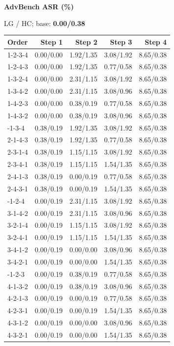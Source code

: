 \hfill
\begin{minipage}[t]{0.325\linewidth}
\centering
{\bfseries AdvBench ASR (\%)}\par
{\small LG / HC; base: \textbf{0.00/0.38}}\par\vspace{5pt}
\small\setlength{\tabcolsep}{3.5pt}\renewcommand{\arraystretch}{1.19}
\begin{tabular}{@{}lrrrr@{}}
\toprule Order & Step 1 & Step 2 & Step 3 & Step 4 \\
\midrule
1-2-3-4 & 0.00/0.00 & 1.92/1.35 & 3.08/1.92 & 8.65/0.38 \\
1-2-4-3 & 0.00/0.00 & 1.92/1.35 & 0.77/0.58 & 8.65/0.38 \\
1-3-2-4 & 0.00/0.00 & 2.31/1.15 & 3.08/1.92 & 8.65/0.38 \\
1-3-4-2 & 0.00/0.00 & 2.31/1.15 & 3.08/0.96 & 8.65/0.38 \\
1-4-2-3 & 0.00/0.00 & 0.38/0.19 & 0.77/0.58 & 8.65/0.38 \\
1-4-3-2 & 0.00/0.00 & 0.38/0.19 & 3.08/0.96 & 8.65/0.38 \\
\addlinespace[3pt]
2-1-3-4 & 0.38/0.19 & 1.92/1.35 & 3.08/1.92 & 8.65/0.38 \\
2-1-4-3 & 0.38/0.19 & 1.92/1.35 & 0.77/0.58 & 8.65/0.38 \\
2-3-1-4 & 0.38/0.19 & 1.15/1.15 & 3.08/1.92 & 8.65/0.38 \\
2-3-4-1 & 0.38/0.19 & 1.15/1.15 & 1.54/1.35 & 8.65/0.38 \\
2-4-1-3 & 0.38/0.19 & 0.00/0.19 & 0.77/0.58 & 8.65/0.38 \\
2-4-3-1 & 0.38/0.19 & 0.00/0.19 & 1.54/1.35 & 8.65/0.38 \\
\addlinespace[3pt]
3-1-2-4 & 0.00/0.19 & 2.31/1.15 & 3.08/1.92 & 8.65/0.38 \\
3-1-4-2 & 0.00/0.19 & 2.31/1.15 & 3.08/0.96 & 8.65/0.38 \\
3-2-1-4 & 0.00/0.19 & 1.15/1.15 & 3.08/1.92 & 8.65/0.38 \\
3-2-4-1 & 0.00/0.19 & 1.15/1.15 & 1.54/1.35 & 8.65/0.38 \\
3-4-1-2 & 0.00/0.19 & 0.00/0.00 & 3.08/0.96 & 8.65/0.38 \\
3-4-2-1 & 0.00/0.19 & 0.00/0.00 & 1.54/1.35 & 8.65/0.38 \\
\addlinespace[3pt]
4-1-2-3 & 0.00/0.19 & 0.38/0.19 & 0.77/0.58 & 8.65/0.38 \\
4-1-3-2 & 0.00/0.19 & 0.38/0.19 & 3.08/0.96 & 8.65/0.38 \\
4-2-1-3 & 0.00/0.19 & 0.00/0.19 & 0.77/0.58 & 8.65/0.38 \\
4-2-3-1 & 0.00/0.19 & 0.00/0.19 & 1.54/1.35 & 8.65/0.38 \\
4-3-1-2 & 0.00/0.19 & 0.00/0.00 & 3.08/0.96 & 8.65/0.38 \\
4-3-2-1 & 0.00/0.19 & 0.00/0.00 & 1.54/1.35 & 8.65/0.38 \\
\bottomrule
\end{tabular}
\end{minipage}
